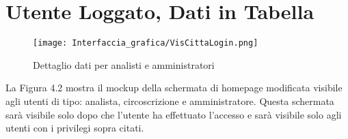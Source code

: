 \newpage
\section{Utente Loggato, Dati in Tabella}

    \begin{figure}[H]
        \center
        \texttt{[image: Interfaccia\_grafica/VisCittaLogin.png]}
        \caption{Dettaglio dati per analisti e amministratori}
    \end{figure}    

    La Figura 4.2 mostra il mockup della schermata di homepage modificata visibile agli utenti di tipo: analista, circoscrizione e amministratore. Questa schermata sarà visibile solo dopo che l'utente ha effettuato l'accesso e sarà visibile solo agli utenti con i privilegi sopra citati.


